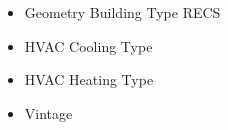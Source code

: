 \begin{itemize}
\item Geometry Building Type RECS
\item HVAC Cooling Type
\item HVAC Heating Type
\item Vintage
\end{itemize}
